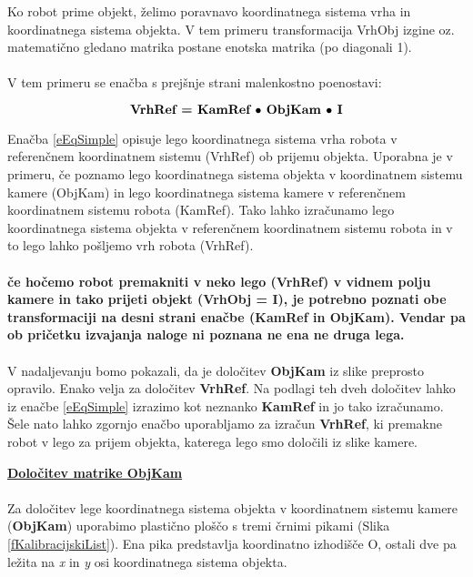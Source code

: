 \noindent %
\begin{mdframed}[backgroundcolor=green!20, shadow=true,roundcorner=8pt]
        \vspace{0.2cm}
Ko robot prime objekt, želimo poravnavo koordinatnega sistema vrha
in koordinatnega sistema objekta. V tem primeru transformacija
VrhObj izgine oz. matematično gledano matrika postane enotska
matrika (po diagonali 1).
\\
\\
V tem primeru se enačba s prejšnje strani malenkostno poenostavi:

\begin{equation}
\centering
\textbf{VrhRef = KamRef $\bullet$ ObjKam $\bullet$ I} %
\label{eEqSimple}
\end{equation}

Enačba \ref{eEqSimple} opisuje lego koordinatnega sistema vrha
robota v referenčnem koordinatnem sistemu (VrhRef) ob prijemu
objekta. Uporabna je v primeru, če poznamo lego koordinatnega
sistema objekta v koordinatnem sistemu kamere (ObjKam) in lego
koordinatnega sistema kamere v referenčnem koordinatnem sistemu
robota (KamRef). Tako lahko izračunamo lego koordinatnega sistema
objekta v referenčnem koordinatnem sistemu robota in v to lego lahko
pošljemo vrh robota (VrhRef).
\\
\\
\textbf{če hočemo robot premakniti v neko lego (VrhRef) v vidnem
polju kamere in tako prijeti objekt (VrhObj = I), je potrebno
poznati obe transformaciji na desni strani enačbe (KamRef in
ObjKam). Vendar pa ob pričetku izvajanja naloge ni poznana ne ena ne
druga lega.}
\\
\\
V nadaljevanju bomo pokazali, da je določitev \textbf{ObjKam }iz
slike preprosto opravilo. Enako velja za določitev \textbf{VrhRef}.
Na podlagi teh dveh določitev lahko iz enačbe \ref{eEqSimple}
izrazimo kot neznanko \textbf{KamRef} in jo tako izračunamo. Šele
nato lahko zgornjo enačbo uporabljamo za izračun \textbf{VrhRef}, ki
premakne robot v lego za prijem objekta, katerega lego smo določili
iz slike kamere.
\end{mdframed}

\noindent %
\textbf{\underline{Določitev matrike ObjKam}} %
\\
~\\
Za določitev lege koordinatnega sistema objekta v koordinatnem
sistemu kamere (\textbf{ObjKam}) uporabimo plastično ploščo s tremi
črnimi pikami (Slika \ref{fKalibracijskiList}). Ena pika predstavlja
koordinatno izhodišče O, ostali dve pa ležita na \emph{x} in
\emph{y} osi koordinatnega sistema objekta.

